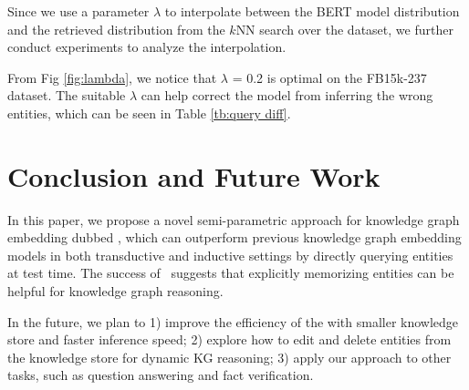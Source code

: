 \documentclass[runningheads]{llncs}
\begin{document}
Since we use a parameter $\lambda$ to interpolate between the BERT model distribution and the retrieved distribution from the $k$NN search over the dataset, we further conduct experiments to analyze the interpolation.

From Fig \ref{fig:lambda}, we notice that $\lambda$ = 0.2 is optimal on the FB15k-237 dataset. 
The suitable $\lambda$ can help correct the model from inferring the wrong entities, which can be seen in Table \ref{tb:query diff}.








 








\section{Conclusion and Future Work}

In this paper, we propose a novel semi-parametric approach for knowledge graph embedding dubbed {\ours}, which can outperform previous knowledge graph embedding models in both transductive and inductive settings by directly querying entities at test time. 
The success of \ours~suggests that explicitly memorizing entities can be helpful for knowledge graph reasoning\cite{qiao2023reasoning,zhang2023multimodal}. 


In the future, we plan to
1) improve the efficiency of the {\ours} with smaller knowledge store and faster inference speed;
2) explore how to edit\cite{yao2023editing} and delete entities from the knowledge store for dynamic KG reasoning;
3)  apply our approach to other tasks, such as question answering and fact verification.


 



\appendix








































\end{document}
